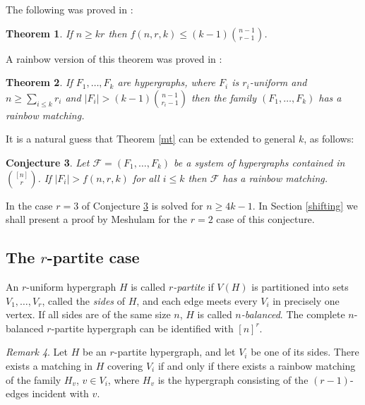 \documentclass{amsart}
\newtheorem{theorem}{Theorem}[section]
\newtheorem{conjecture}[theorem]{Conjecture}
\theoremstyle{remark}
\newtheorem{remark}[theorem]{Remark}
\newcommand{\cf}{\mathcal F}
\begin{document}
The following  was proved in \cite{frankl}:

\begin{theorem}
If $n \ge kr$ then $f(n,r,k) \le (k-1)\binom{n-1}{r-1}$.
\end{theorem}

A rainbow version of this theorem was proved in \cite{hls}:



\begin{theorem}\cite{hls}
If $F_1, \ldots, F_k$ are hypergraphs, where $F_i$ is $r_i$-uniform
and $n \ge \sum_{i \le k}r_i$ and $|F_i|>(k-1)\binom{n-1}{r_i-1}$
then the family $(F_1, \ldots, F_k)$ has a rainbow matching.
\end{theorem}



It is a natural guess that Theorem \ref{mt} can be extended to
general $k$, as follows:




\begin{conjecture}\label{rainbowgeneral}
Let $\cf=(F_1, \ldots, F_k)$ be a system of hypergraphs contained in
$\binom{[n]}{r}$. If $|F_i|>f(n,r,k)$  for all $i \le k$ then $\cf$ has a
rainbow matching. \end{conjecture}



In \cite{hy} the case $r=3$ of Conjecture \ref{rainbowgeneral} is
solved for $n \ge 4k-1$. In Section \ref{shifting} we shall present
a proof by Meshulam for the $r=2$ case of this conjecture.

\subsection{The $r$-partite case}

An $r$-uniform hypergraph $H$ is called {\em $r$-partite} if $V(H)$
is partitioned into sets $V_1,\ldots, V_r$, called the {\em sides}
of $H$, and each edge meets every $V_i$ in precisely one vertex. If
all sides are of the same size $n$, $H$ is called {\em
$n$-balanced}. The complete $n$-balanced $r$-partite hypergraph can be identified with $[n]^r$.

\begin{remark} Let $H$ be an $r$-partite hypergraph, and let $V_i$ be one of its sides. There exists a matching in $H$ covering
$V_i$ if and only if  there exists a  rainbow matching of the family
 $H_v$, $v \in V_i$, where $H_v$ is the hypergraph
consisting of the $(r-1)$-edges incident with  $v$. \end{remark}
\end{document}
